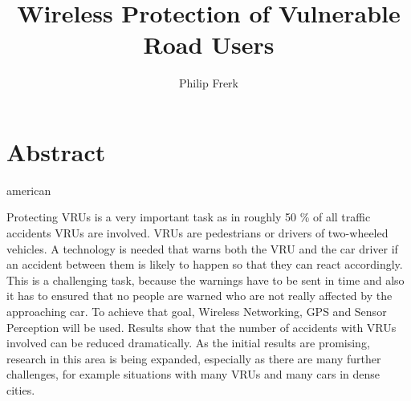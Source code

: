 \documentclass[]{ccs-thesis}
\author{Philip Frerk}
\title{Wireless Protection of Vulnerable Road Users}
\begin{document}

\maketitle


\chapter*{Abstract}
\begin{otherlanguage*}{american}

Protecting \acp{VRU} is a very important task as in roughly 50 \% of all traffic accidents \acp{VRU} are involved. \acp{VRU} are pedestrians or drivers of two-wheeled vehicles.
A technology is needed that warns both the \ac{VRU} and the car driver if an accident between them is likely to happen so that they can react accordingly.  This is a challenging task, because the warnings have to be sent in time  and also it has to ensured that no people are warned who are not really affected by the approaching car.
To achieve that goal, Wireless Networking, GPS and Sensor Perception will be used.
Results show that the number of accidents with \acp{VRU} involved can be reduced dramatically.
As the initial results are promising, research in this area is being expanded, especially as there are many further challenges, for example situations with many \acp{VRU} and many cars in dense cities.


\end{otherlanguage*}
\end{document}
